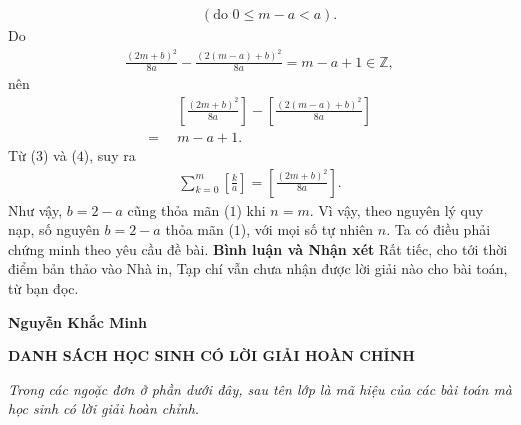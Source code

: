 \begin{multicols}{2}
\begin{align*}
			&\,\,\,(\text{do } 0 \le m-a < a).
	\end{align*}
	Do
	\begin{align*}
		\frac{{{{\left( {2m \!+\! b} \right)}^2}}}{{8a}} \!-\! \frac{{{{\left( {2\left( {m \!-\! a} \right) \!+\! b} \right)}^2}}}{{8a}} \!=\! m \!-\! a \!+\! 1 \!\in\! \mathbb{Z},
	\end{align*}
	nên
	\begin{align*}
		&\left[ {\frac{{{{\left( {2m + b} \right)}^2}}}{{8a}}} \right] - \left[ {\frac{{{{\left( {2\left( {m - a} \right) + b} \right)}^2}}}{{8a}}} \right] \\
		= \,\,\,&m - a + 1. \tag{$4$}
	\end{align*}
	Từ ($3$) và ($4$), suy ra
	\begin{align*}
		\sum\limits_{k = 0}^m {\left[ {\frac{k}{a}} \right]}  = \left[ {\frac{{{{\left( {2m + b} \right)}^2}}}{{8a}}} \right].
	\end{align*}
	Như vậy, $b = 2 - a$ cũng thỏa mãn ($1$) khi $n = m$.
	\vskip 0.05cm
	Vì vậy, theo nguyên lý quy nạp, số nguyên $b = 2 - a$ thỏa mãn ($1$), với mọi số tự nhiên $n$.
	\vskip 0.05cm
	Ta có điều phải chứng minh theo yêu cầu đề bài.
	\vskip 0.05cm
	\textbf{\color{thachthuctoanhoc}Bình luận và Nhận xét}
	\vskip 0.05cm
	Rất tiếc, cho tới thời điểm bản thảo vào Nhà in, Tạp chí vẫn chưa nhận được lời giải nào cho bài toán, từ bạn đọc.
	\begin{flushright}
		\textbf{\color{thachthuctoanhoc}Nguyễn Khắc Minh}
	\end{flushright}
\end{multicols}	
\newpage
\centerline{\textbf{\color{thachthuctoanhoc}DANH SÁCH HỌC SINH CÓ LỜI GIẢI HOÀN CHỈNH}}
\vskip 0.1cm
\textit{Trong các ngoặc đơn ở phần dưới đây, sau tên lớp là mã hiệu của các bài toán mà học sinh có lời giải hoàn chỉnh.}
